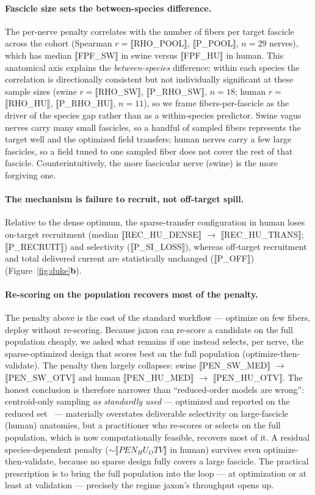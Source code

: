 \paragraph{Fascicle size sets the between-species difference.}
The per-nerve penalty correlates with the number of fibers per target fascicle
across the cohort (Spearman $r=$⟦RHO_POOL⟧, ⟦P_POOL⟧, $n=29$ nerves), which has
median ⟦FPF_SW⟧ in swine versus ⟦FPF_HU⟧ in human.  This anatomical axis
explains the \emph{between-species} difference; within each species the
correlation is directionally consistent but not individually significant at
these sample sizes (swine $r=$⟦RHO_SW⟧, ⟦P_RHO_SW⟧, $n=18$; human
$r=$⟦RHO_HU⟧, ⟦P_RHO_HU⟧, $n=11$), so we frame fibers-per-fascicle as the
driver of the species gap rather than as a within-species predictor.  Swine
vagus nerves carry many small fascicles, so a handful of sampled fibers
represents the target well and the optimized field transfers; human nerves
carry a few large fascicles, so a field tuned to one sampled fiber does not
cover the rest of that fascicle.  Counterintuitively, the more fascicular
nerve (swine) is the more forgiving one.

\paragraph{The mechanism is failure to recruit, not off-target spill.}
Relative to the dense optimum, the sparse-transfer configuration in human loses
on-target recruitment (median ⟦REC_HU_DENSE⟧ $\rightarrow$ ⟦REC_HU_TRANS⟧;
⟦P_RECRUIT⟧) and selectivity (⟦P_SI_LOSS⟧), whereas off-target recruitment and
total delivered current are statistically unchanged (⟦P_OFF⟧)
(Figure~\ref{fig:duke}\textbf{b}).

\paragraph{Re-scoring on the population recovers most of the penalty.}
The penalty above is the cost of the standard workflow --- optimize on few
fibers, deploy without re-scoring.  Because jaxon can re-score a candidate on
the full population cheaply, we asked what remains if one instead selects, per
nerve, the sparse-optimized design that scores best on the full population
(optimize-then-validate).  The penalty then largely collapses: swine
⟦PEN_SW_MED⟧ $\rightarrow$ ⟦PEN_SW_OTV⟧ and human ⟦PEN_HU_MED⟧ $\rightarrow$
⟦PEN_HU_OTV⟧.  The honest conclusion is therefore narrower than ``reduced-order
models are wrong'': centroid-only sampling \emph{as standardly used} ---
optimized and reported on the reduced set~\cite{hussain2024axonml} --- materially
overstates deliverable selectivity on large-fascicle (human) anatomies, but a
practitioner who re-scores or selects on the full population, which is now
computationally feasible, recovers most of it.  A residual species-dependent
penalty (${\sim}⟦PEN_HU_OTV⟧$ in human) survives even optimize-then-validate,
because no sparse design fully covers a large fascicle.  The practical
prescription is to bring the full population into the loop --- at optimization
or at least at validation --- precisely the regime jaxon's throughput opens up.

